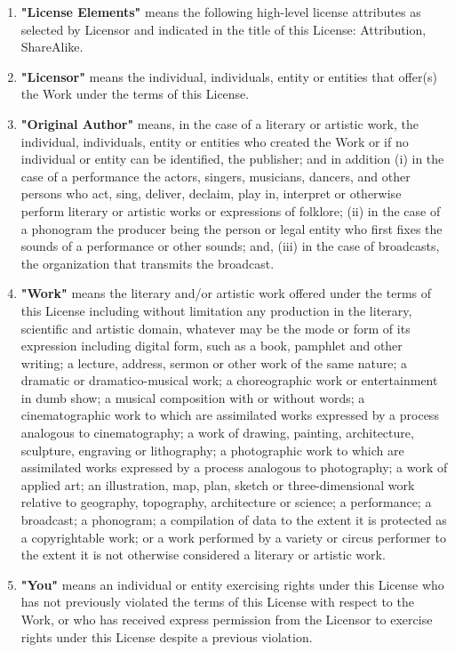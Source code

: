 \begin{enumerate}
\item \textbf{"License Elements"} means the
  following high-level license attributes as selected by
  Licensor and indicated in the title of this License:
  Attribution, ShareAlike.

\item \textbf{"Licensor"} means the individual,
  individuals, entity or entities that offer(s) the Work
  under the terms of this License.

\item \textbf{"Original Author"} means, in the case
  of a literary or artistic work, the individual,
  individuals, entity or entities who created the Work or
  if no individual or entity can be identified, the
  publisher; and in addition (i) in the case of a
  performance the actors, singers, musicians, dancers, and
  other persons who act, sing, deliver, declaim, play in,
  interpret or otherwise perform literary or artistic works
  or expressions of folklore; (ii) in the case of a
  phonogram the producer being the person or legal entity
  who first fixes the sounds of a performance or other
  sounds; and, (iii) in the case of broadcasts, the
  organization that transmits the broadcast.

\item \textbf{"Work"} means the literary and/or
  artistic work offered under the terms of this License
  including without limitation any production in the
  literary, scientific and artistic domain, whatever may be
  the mode or form of its expression including digital
  form, such as a book, pamphlet and other writing; a
  lecture, address, sermon or other work of the same
  nature; a dramatic or dramatico-musical work; a
  choreographic work or entertainment in dumb show; a
  musical composition with or without words; a
  cinematographic work to which are assimilated works
  expressed by a process analogous to cinematography; a
  work of drawing, painting, architecture, sculpture,
  engraving or lithography; a photographic work to which
  are assimilated works expressed by a process analogous to
  photography; a work of applied art; an illustration, map,
  plan, sketch or three-dimensional work relative to
  geography, topography, architecture or science; a
  performance; a broadcast; a phonogram; a compilation of
  data to the extent it is protected as a copyrightable
  work; or a work performed by a variety or circus
  performer to the extent it is not otherwise considered a
  literary or artistic work.

\item \textbf{"You"} means an individual or entity
  exercising rights under this License who has not
  previously violated the terms of this License with
  respect to the Work, or who has received express
  permission from the Licensor to exercise rights under
  this License despite a previous violation.


\end{enumerate}
